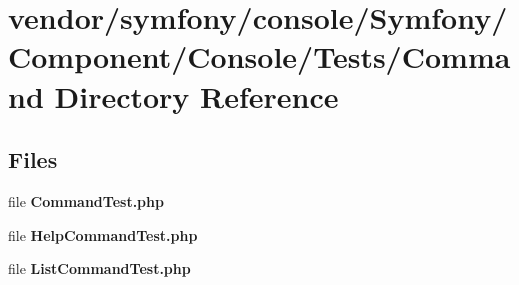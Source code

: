 \section{vendor/symfony/console/\+Symfony/\+Component/\+Console/\+Tests/\+Command Directory Reference}
\label{dir_44592c5e749af3c552d87e4d6520371c}
\subsection*{Files}
\begin{DoxyCompactItemize}
\item 
file {\bf Command\+Test.\+php}
\item 
file {\bf Help\+Command\+Test.\+php}
\item 
file {\bf List\+Command\+Test.\+php}
\end{DoxyCompactItemize}
